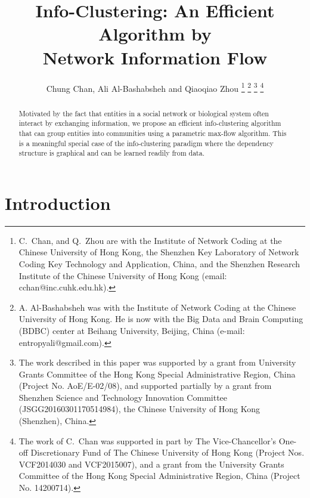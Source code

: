 \documentclass[conference,letterpaper]{IEEEtran}
\title{Info-Clustering: An Efficient Algorithm by\\ Network Information Flow}
\author{Chung Chan, Ali Al-Bashabsheh and Qiaoqiao Zhou
	\thanks{C.\ Chan, and Q.\ Zhou are with the Institute of Network Coding at the Chinese University of Hong Kong, the Shenzhen Key Laboratory of Network Coding Key Technology and Application, China, and the	Shenzhen Research Institute of the Chinese University of Hong Kong (email: cchan@inc.cuhk.edu.hk).
	}
	\thanks{A. Al-Bashabsheh was with the Institute of Network Coding at the	Chinese University of Hong Kong. He is now with the Big Data and Brain Computing (BDBC) center at Beihang University, Beijing, China (e-mail: entropyali@gmail.com).}
	\thanks{The work described in this paper was supported by a grant from University Grants Committee of the Hong Kong Special Administrative Region, China (Project No. AoE/E-02/08), and supported partially by a grant from Shenzhen Science and Technology Innovation Committee (JSGG20160301170514984), the Chinese University of Hong Kong (Shenzhen), China.}
	\thanks{The work of C.\ Chan was supported in part by The Vice-Chancellor's One-off Discretionary Fund of The Chinese University of Hong Kong (Project Nos. VCF2014030 and VCF2015007), and a grant from the University	Grants Committee of the Hong Kong Special Administrative Region, China (Project No. 14200714).}}
\begin{document}
%
\IEEEoverridecommandlockouts
\maketitle

\begin{abstract}
Motivated by the fact that entities in a social network or biological system often interact by exchanging information, we propose an efficient info-clustering algorithm that can group entities into communities using a parametric max-flow algorithm. This is a meaningful special case of the info-clustering paradigm where the dependency structure is graphical and can be learned readily from data. %
\end{abstract} 



\section{Introduction}

%
%
% 
\end{document}
